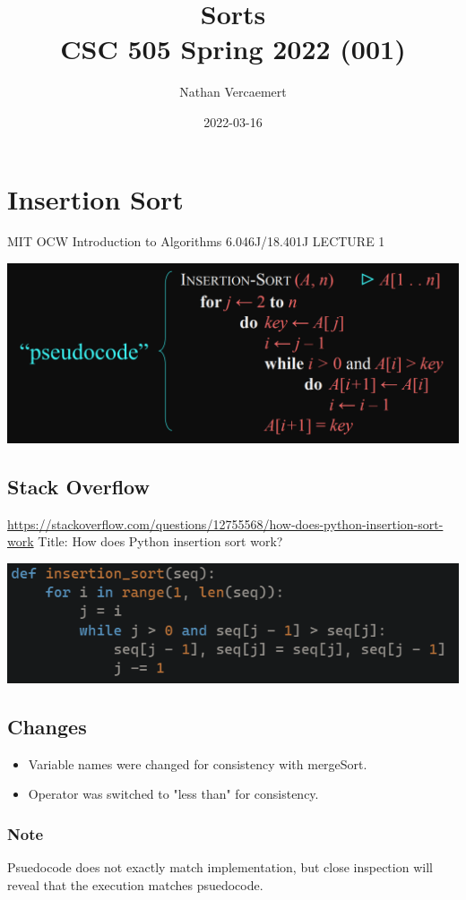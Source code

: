 \documentclass[11pt]{article}
\author{Nathan Vercaemert}
\date{2022-03-16}
\title{Sorts\\\medskip
\large CSC 505 Spring 2022 (001)}
\begin{document}
\maketitle
\tableofcontents

\section{Insertion Sort}
\label{sec:orgff32f52}
MIT OCW Introduction to Algorithms 6.046J/18.401J LECTURE 1
\begin{center}
\includegraphics[width=.9\linewidth]{./Screenshot 2022-03-16 095958.png}
\end{center}
\subsection{Stack Overflow}
\label{sec:org857b812}
\url{https://stackoverflow.com/questions/12755568/how-does-python-insertion-sort-work}
Title: How does Python insertion sort work?
\begin{center}
\includegraphics[width=.9\linewidth]{./Screenshot 2022-03-16 100657.png}
\end{center}
\subsection{Changes}
\label{sec:org7a7682b}
\begin{itemize}
\item Variable names were changed for consistency with mergeSort.
\item Operator was switched to "less than" for consistency.
\end{itemize}
\subsubsection{Note}
\label{sec:orgfb6e647}
Psuedocode does not exactly match implementation, but close inspection will reveal that the execution matches psuedocode.
\end{document}

